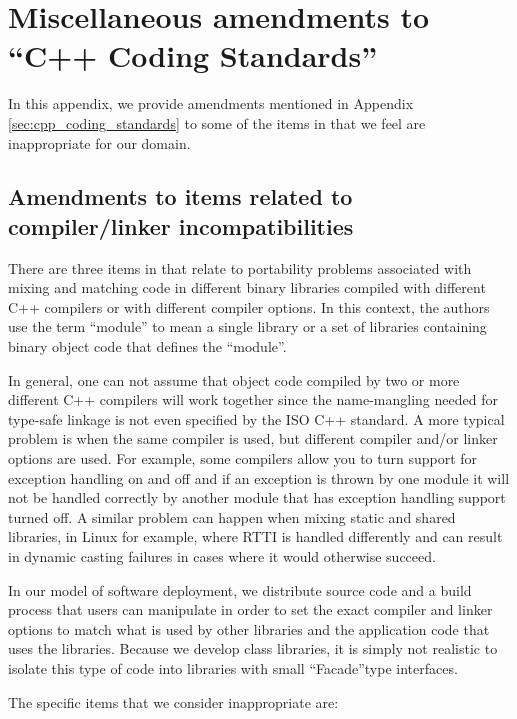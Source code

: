 %
\section{Miscellaneous amendments to ``C++ Coding Standards''}
\label{sec:misc_amendments}
%

In this appendix, we provide amendments mentioned in Appendix
{}\ref{sec:cpp_coding_standards} to some of the items in
{}\cite{C++CodingStandards05} that we feel are inappropriate for our domain.

%
\subsection{Amendments to items related to compiler/linker incompatibilities}
%

There are three items in {}\cite{C++CodingStandards05} that relate to
portability problems associated with mixing and matching code in different
binary libraries compiled with different C++ compilers or with different
compiler options.  In this context, the authors use the term ``module'' to
mean a single library or a set of libraries containing binary object code that
defines the ``module''.

In general, one can not assume that object code compiled by two or more
different C++ compilers will work together since the name-mangling needed for
type-safe linkage is not even specified by the ISO C++ standard.  A more
typical problem is when the same compiler is used, but different compiler
and/or linker options are used.  For example, some compilers allow you to turn
support for exception handling on and off and if an exception is thrown by one
module it will not be handled correctly by another module that has exception
handling support turned off.  A similar problem can happen when mixing static
and shared libraries, in Linux for example, where RTTI is handled differently
and can result in dynamic casting failures in cases where it would otherwise
succeed.

In our model of software deployment, we distribute source code and a build
process that users can manipulate in order to set the exact compiler and
linker options to match what is used by other libraries and the application
code that uses the libraries.  Because we develop class libraries, it is
simply not realistic to isolate this type of code into libraries with small
``Facade''type interfaces.

The specific items that we consider inappropriate are:

